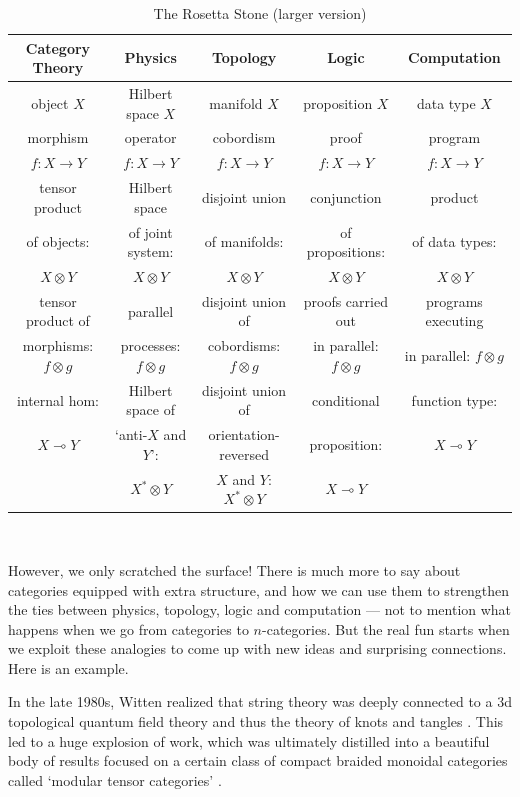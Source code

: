 \documentclass[12pt,twoside,openright]{report}
\newcommand{\maps}{\colon}
\newcommand{\lhom}{\multimap}
\newcommand{\tensor}{\otimes}
\begin{document}
\begin{table}[h]
\begin{center}
\begin{tabular}{|c|c|c|c|c|}
\hline Category Theory & Physics & Topology  & Logic & Computation 
\\
\hline object $X$       &
Hilbert space $X$  &
manifold $X$ &
proposition $X$ &
data type $X$
\\
\hline morphism &
operator &
cobordism &
proof  &
program  \\
$f\maps X \to Y$ &
$f\maps X \to Y$ &
$f \maps X \to Y$ &
$f \maps X \to Y$ &
$f \maps X \to Y$
\\
\hline tensor product  &
Hilbert space   &
disjoint union &
conjunction &
product 
\\
of objects: &
of joint system: &
of manifolds: &
of propositions: &
of data types: 
\\
$X \tensor Y$ &
$X \tensor Y$ &
$X \tensor Y$ &
$X \tensor Y$ &
$X \tensor Y$
\\
\hline tensor product of &
parallel  &
disjoint union of &
proofs carried out & 
programs executing
\\
morphisms: $f \tensor g$ & 
processes: $f \tensor g$ & 
cobordisms: $f \tensor g$ & 
in parallel: $f \tensor g$ &
in parallel: $f \tensor g$
\\
\hline internal hom:   &
Hilbert space of &
disjoint union of  &
conditional &
function type:
\\
$X \lhom Y$    &
`anti-$X$ and $Y$':  &
orientation-reversed &
proposition: &
$X \lhom Y$
\\
    &
$X^* \tensor Y$    &
$X$ and $Y$: $X^* \tensor Y$ &
$X \lhom Y$ &
\\
\hline
\end{tabular}
\\
\caption{The Rosetta Stone (larger version)}
\label{analogy_detailed}
\end{center}
\end{table}

However, we only scratched the surface!   There is much more to say about categories equipped with extra structure, and how we can use them to strengthen the ties between physics, topology, logic and computation ---
not to mention what happens when we go from categories to $n$-categories. But the real fun starts when we exploit these analogies to come up with new ideas and surprising connections.  Here is an example.

In the late 1980s, Witten \cite{Witten}
realized that string theory was deeply connected to a 3d topological quantum field theory and thus the theory of knots and tangles 
\cite{Kohno}.   This led to a huge explosion of work, which was ultimately distilled into a beautiful body of results focused on a certain class of compact braided monoidal categories called `modular tensor categories' \cite{BK,Turaev}.  
\end{document}
